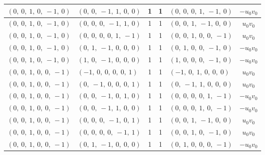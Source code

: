 \documentclass[11pt]{article}
\theoremstyle{definition}
\begin{document}
\begin{longtable}{|l|l|c|c|l|c|}
    \hline
    $\left( 0, \  0, \  1, \  0, \  -1, \  0\right)$ & $\left( 0, \  0, \  -1, \  1, \  0, \  0\right)$ & 1 & 1 & $\left( 0, \  0, \  0, \  1, \  -1, \  0\right)$ & $- u_{0} v_{0}$ \\
    \hline
    $\left( 0, \  0, \  1, \  0, \  -1, \  0\right)$ & $\left( 0, \  0, \  0, \  -1, \  1, \  0\right)$ & 1 & 1 & $\left( 0, \  0, \  1, \  -1, \  0, \  0\right)$ & $u_{0} v_{0}$ \\
    \hline
    $\left( 0, \  0, \  1, \  0, \  -1, \  0\right)$ & $\left( 0, \  0, \  0, \  0, \  1, \  -1\right)$ & 1 & 1 & $\left( 0, \  0, \  1, \  0, \  0, \  -1\right)$ & $u_{0} v_{0}$ \\
    \hline
    $\left( 0, \  0, \  1, \  0, \  -1, \  0\right)$ & $\left( 0, \  1, \  -1, \  0, \  0, \  0\right)$ & 1 & 1 & $\left( 0, \  1, \  0, \  0, \  -1, \  0\right)$ & $- u_{0} v_{0}$ \\
    \hline
    $\left( 0, \  0, \  1, \  0, \  -1, \  0\right)$ & $\left( 1, \  0, \  -1, \  0, \  0, \  0\right)$ & 1 & 1 & $\left( 1, \  0, \  0, \  0, \  -1, \  0\right)$ & $- u_{0} v_{0}$ \\
    \hline
    $\left( 0, \  0, \  1, \  0, \  0, \  -1\right)$ & $\left( -1, \  0, \  0, \  0, \  0, \  1\right)$ & 1 & 1 & $\left( -1, \  0, \  1, \  0, \  0, \  0\right)$ & $u_{0} v_{0}$ \\
    \hline
    $\left( 0, \  0, \  1, \  0, \  0, \  -1\right)$ & $\left( 0, \  -1, \  0, \  0, \  0, \  1\right)$ & 1 & 1 & $\left( 0, \  -1, \  1, \  0, \  0, \  0\right)$ & $u_{0} v_{0}$ \\
    \hline
    $\left( 0, \  0, \  1, \  0, \  0, \  -1\right)$ & $\left( 0, \  0, \  -1, \  0, \  1, \  0\right)$ & 1 & 1 & $\left( 0, \  0, \  0, \  0, \  1, \  -1\right)$ & $- u_{0} v_{0}$ \\
    \hline
    $\left( 0, \  0, \  1, \  0, \  0, \  -1\right)$ & $\left( 0, \  0, \  -1, \  1, \  0, \  0\right)$ & 1 & 1 & $\left( 0, \  0, \  0, \  1, \  0, \  -1\right)$ & $- u_{0} v_{0}$ \\
    \hline
    $\left( 0, \  0, \  1, \  0, \  0, \  -1\right)$ & $\left( 0, \  0, \  0, \  -1, \  0, \  1\right)$ & 1 & 1 & $\left( 0, \  0, \  1, \  -1, \  0, \  0\right)$ & $u_{0} v_{0}$ \\
    \hline
    $\left( 0, \  0, \  1, \  0, \  0, \  -1\right)$ & $\left( 0, \  0, \  0, \  0, \  -1, \  1\right)$ & 1 & 1 & $\left( 0, \  0, \  1, \  0, \  -1, \  0\right)$ & $u_{0} v_{0}$ \\
    \hline
    $\left( 0, \  0, \  1, \  0, \  0, \  -1\right)$ & $\left( 0, \  1, \  -1, \  0, \  0, \  0\right)$ & 1 & 1 & $\left( 0, \  1, \  0, \  0, \  0, \  -1\right)$ & $- u_{0} v_{0}$ \\

\end{longtable}
\end{document}
